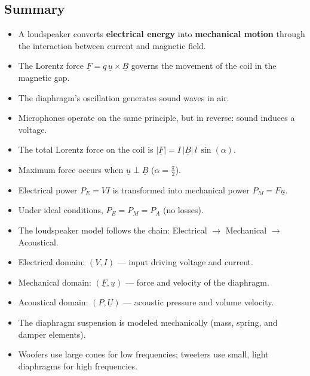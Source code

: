  \clearpage 


 
\subsection{Summary}
\begin{tcolorbox}[colback=gray!10!white,colframe=black,title=\textbf{Summary – Electrodynamic Loudspeaker}]
\begin{itemize}
    \item A loudspeaker converts \textbf{electrical energy} into \textbf{mechanical motion} through the interaction between current and magnetic field.
    \item The Lorentz force \( \underline{F} = q\,\underline{u} \times \underline{B} \) governs the movement of the coil in the magnetic gap.
    \item The diaphragm’s oscillation generates sound waves in air.
    \item Microphones operate on the same principle, but in reverse: sound induces a voltage.
\end{itemize}
\end{tcolorbox}

\begin{tcolorbox}[colback=gray!10!white,colframe=black,title=\textbf{Summary – Force and Power in Loudspeakers}]
\begin{itemize}
    \item The total Lorentz force on the coil is $|\underline{F}| = I\,|\underline{B}|\,l\,\sin(\alpha)$.
    \item Maximum force occurs when $\underline{u} \perp \underline{B}$ ($\alpha = \frac{\pi}{2}$).
    \item Electrical power $P_E = V I$ is transformed into mechanical power $P_M = F \underline{u}$.
    \item Under ideal conditions, $P_E = P_M = P_A$ (no losses).
\end{itemize}
\end{tcolorbox}


\begin{tcolorbox}[colback=gray!10!white,colframe=black,title=\textbf{Summary – Loudspeaker Modeling Approach}]
\begin{itemize}
    \item The loudspeaker model follows the chain: Electrical $\rightarrow$ Mechanical $\rightarrow$ Acoustical.
    \item Electrical domain: $(V, I)$ — input driving voltage and current.
    \item Mechanical domain: $(\underline{F}, \underline{u})$ — force and velocity of the diaphragm.
    \item Acoustical domain: $(P, \underline{U})$ — acoustic pressure and volume velocity.
    \item The diaphragm suspension is modeled mechanically (mass, spring, and damper elements).
    \item Woofers use large cones for low frequencies; tweeters use small, light diaphragms for high frequencies.
\end{itemize}
\end{tcolorbox}


